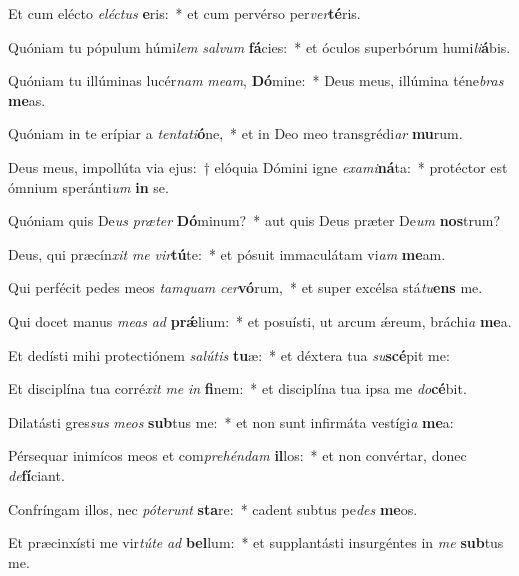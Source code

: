 \item Et cum elécto \textit{e}\textit{léc}\textit{tus} \textbf{e}ris:~* et cum pervérso per\textit{ver}\textbf{té}ris.
\item Quóniam tu pópulum húmi\textit{lem} \textit{sal}\textit{vum} \textbf{fá}cies:~* et óculos superbórum humi\textit{li}\textbf{á}bis.
\item Quóniam tu illúminas lucér\textit{nam} \textit{me}\textit{am}, \textbf{Dó}mine:~* Deus meus, illúmina téne\textit{bras} \textbf{me}as.
\item Quóniam in te erípiar a \textit{ten}\textit{ta}\textit{ti}\textbf{ó}ne,~* et in Deo meo transgrédi\textit{ar} \textbf{mu}rum.
\item Deus meus, impollúta via ejus:~† elóquia Dómini igne \textit{ex}\textit{a}\textit{mi}\textbf{ná}ta:~* protéctor est ómnium speránti\textit{um} \textbf{in} se.
\item Quóniam quis De\textit{us} \textit{præ}\textit{ter} \textbf{Dó}minum?~* aut quis Deus præter De\textit{um} \textbf{nos}trum?
\item Deus, qui præcín\textit{xit} \textit{me} \textit{vir}\textbf{tú}te:~* et pósuit immaculátam vi\textit{am} \textbf{me}am.
\item Qui perfécit pedes meos \textit{tam}\textit{quam} \textit{cer}\textbf{vó}rum,~* et super excélsa stá\textit{tu}\textbf{ens} me.
\item Qui docet manus \textit{me}\textit{as} \textit{ad} \textbf{prǽ}lium:~* et posuísti, ut arcum ǽreum, bráchi\textit{a} \textbf{me}a.
\item Et dedísti mihi protectiónem \textit{sa}\textit{lú}\textit{tis} \textbf{tu}æ:~* et déxtera tua \textit{su}\textbf{scé}pit me:
\item Et disciplína tua corré\textit{xit} \textit{me} \textit{in} \textbf{fi}nem:~* et disciplína tua ipsa me \textit{do}\textbf{cé}bit.
\item Dilatásti gres\textit{sus} \textit{me}\textit{os} \textbf{sub}tus me:~* et non sunt infirmáta vestígi\textit{a} \textbf{me}a:
\item Pérsequar inimícos meos et com\textit{pre}\textit{hén}\textit{dam} \textbf{il}los:~* et non convértar, donec \textit{de}\textbf{fí}ciant.
\item Confríngam illos, nec \textit{pót}\textit{e}\textit{runt} \textbf{sta}re:~* cadent subtus pe\textit{des} \textbf{me}os.
\item Et præcinxísti me vir\textit{tú}\textit{te} \textit{ad} \textbf{bel}lum:~* et supplantásti insurgéntes in \textit{me} \textbf{sub}tus me.
